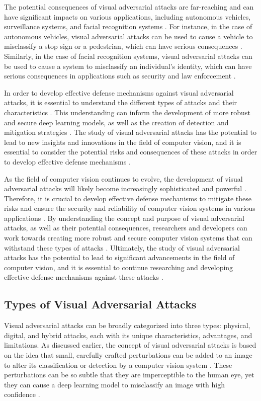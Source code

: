 \documentclass[11pt]{article}
\begin{document}
The potential consequences of visual adversarial attacks are far-reaching and can have significant impacts on various applications, including autonomous vehicles, surveillance systems, and facial recognition systems \cite{ref6}. For instance, in the case of autonomous vehicles, visual adversarial attacks can be used to cause a vehicle to misclassify a stop sign or a pedestrian, which can have serious consequences \cite{ref6}. Similarly, in the case of facial recognition systems, visual adversarial attacks can be used to cause a system to misclassify an individual's identity, which can have serious consequences in applications such as security and law enforcement \cite{ref6}.

In order to develop effective defense mechanisms against visual adversarial attacks, it is essential to understand the different types of attacks and their characteristics \cite{ref4}. This understanding can inform the development of more robust and secure deep learning models, as well as the creation of detection and mitigation strategies \cite{ref3}. The study of visual adversarial attacks has the potential to lead to new insights and innovations in the field of computer vision, and it is essential to consider the potential risks and consequences of these attacks in order to develop effective defense mechanisms \cite{ref6}.

As the field of computer vision continues to evolve, the development of visual adversarial attacks will likely become increasingly sophisticated and powerful \cite{ref4}. Therefore, it is crucial to develop effective defense mechanisms to mitigate these risks and ensure the security and reliability of computer vision systems in various applications \cite{ref6}. By understanding the concept and purpose of visual adversarial attacks, as well as their potential consequences, researchers and developers can work towards creating more robust and secure computer vision systems that can withstand these types of attacks \cite{ref5}. Ultimately, the study of visual adversarial attacks has the potential to lead to significant advancements in the field of computer vision, and it is essential to continue researching and developing effective defense mechanisms against these attacks \cite{ref3}.

\subsection{Types of Visual Adversarial Attacks}

Visual adversarial attacks can be broadly categorized into three types: physical, digital, and hybrid attacks, each with its unique characteristics, advantages, and limitations. As discussed earlier, the concept of visual adversarial attacks is based on the idea that small, carefully crafted perturbations can be added to an image to alter its classification or detection by a computer vision system \cite{ref2}. These perturbations can be so subtle that they are imperceptible to the human eye, yet they can cause a deep learning model to misclassify an image with high confidence \cite{ref3}.
\end{document}

